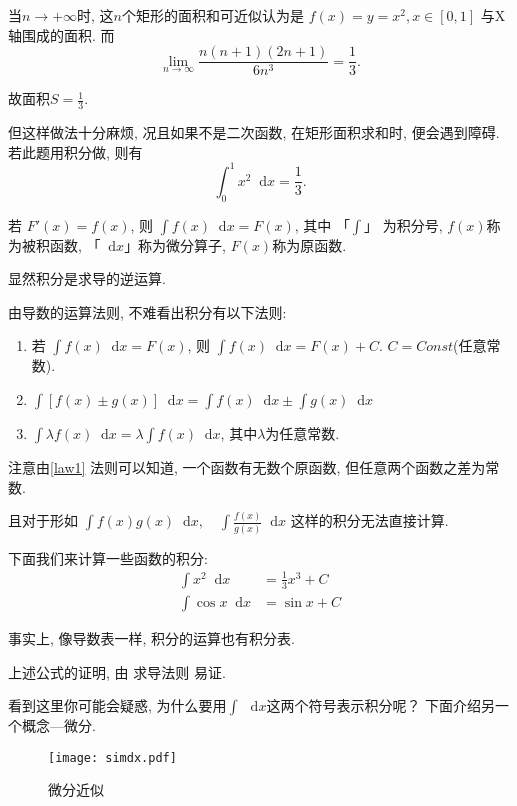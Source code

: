 \documentclass[UTF8]{mathrep}
\newcommand*{\dif}{\mathop{}\!\mathrm{d}}
\begin{document}
当$n \to +\infty$时,
这$n$个矩形的面积和可近似认为是 $f(x) = y = x^{2},x\in [0, 1] $ 与X轴围成的面积.
而
\[
  \lim_{n \to \infty} \frac{n(n+1)(2n+1)}{6n^3 } = \frac{1}{3}
.\]

故面积$ S = \frac{1}{3}$.

但这样做法十分麻烦, 况且如果不是二次函数, 在矩形面积求和时, 便会遇到障碍.
若此题用积分做, 则有
\[
  \int_{0}^{1} x^{2} \dif x= \frac{1}{3}
.\]
\begin{definition}[积分]
  若 $F'(x) = f(x)$, 则 $\int f(x) \dif x = F(x)$, 其中 「$\int $」 为积分号,
  $f(x)$称为被积函数, 「$\dif x$」称为微分算子, $F(x)$称为原函数.
\end{definition}
显然积分是求导的逆运算.

由导数的运算法则, 不难看出积分有以下法则:
\begin{enumerate}

  \item \label{law1} 若 $\int f(x) \dif x = F(x)$, 则 $\int  f(x) \dif x
    = F(x) + C$. $C = Const $(任意常数).
  \item $\int [f(x) \pm g(x)] \dif x = \int f(x) \dif x \pm \int g(x) \dif x$
  \item $\int \lambda f(x) \dif x = \lambda \int f(x) \dif x$,
    其中$\lambda $为任意常数.

\end{enumerate}

注意由\cref{law1} 法则可以知道, 一个函数有无数个原函数,
但任意两个函数之差为常数.

且对于形如 $\int f(x)g(x) \dif x,\quad \int \frac{f(x)}{g(x)} \dif x$ 这样的积分无法直接计算.

下面我们来计算一些函数的积分:
\begin{align*}
  \int x^{2} \dif x  & = \frac{1}{3} x ^3 +C \\
  \int \cos x \dif x & = \sin x + C
\end{align*}

事实上, 像导数表一样, 积分的运算也有积分表.



上述公式的证明, 由 求导法则 易证.

看到这里你可能会疑惑, 为什么要用$\int \,\dif x$这两个符号表示积分呢？
下面介绍另一个概念---微分.

\begin{figure}[!ht]
  \begin{center}
    \texttt{[image: simdx.pdf]}
    \caption{微分近似}\label{fig:simdx}
  \end{center}
\end{figure}
\end{document}
